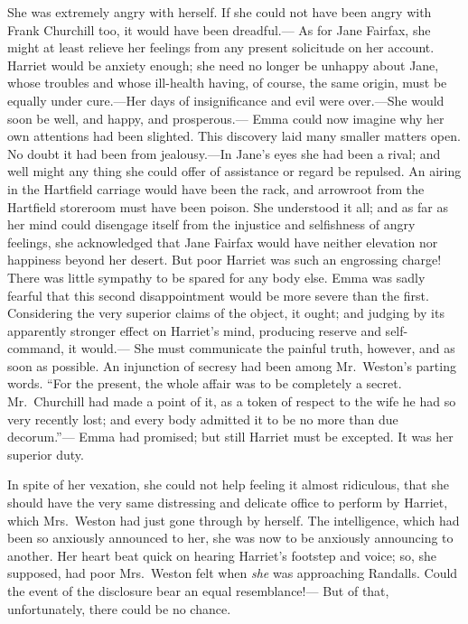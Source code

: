 She was extremely angry with herself.  If she could not have been
angry with Frank Churchill too, it would have been dreadful.---%
As for Jane Fairfax, she might at least relieve her feelings
from any present solicitude on her account.  Harriet would
be anxiety enough; she need no longer be unhappy about Jane,
whose troubles and whose ill-health having, of course, the same origin,
must be equally under cure.---Her days of insignificance and evil
were over.---She would soon be well, and happy, and prosperous.---%
Emma could now imagine why her own attentions had been slighted.
This discovery laid many smaller matters open.  No doubt it had been
from jealousy.---In Jane's eyes she had been a rival; and well might
any thing she could offer of assistance or regard be repulsed.
An airing in the Hartfield carriage would have been the rack,
and arrowroot from the Hartfield storeroom must have been poison.
She understood it all; and as far as her mind could disengage itself
from the injustice and selfishness of angry feelings, she acknowledged
that Jane Fairfax would have neither elevation nor happiness beyond
her desert.  But poor Harriet was such an engrossing charge!
There was little sympathy to be spared for any body else.
Emma was sadly fearful that this second disappointment would be
more severe than the first.  Considering the very superior claims
of the object, it ought; and judging by its apparently stronger effect
on Harriet's mind, producing reserve and self-command, it would.---%
She must communicate the painful truth, however, and as soon
as possible.  An injunction of secresy had been among Mr.\ Weston's
parting words.  ``For the present, the whole affair was to be
completely a secret.  Mr.\ Churchill had made a point of it,
as a token of respect to the wife he had so very recently lost;
and every body admitted it to be no more than due decorum.''---%
Emma had promised; but still Harriet must be excepted.  It was her
superior duty.

In spite of her vexation, she could not help feeling it almost ridiculous,
that she should have the very same distressing and delicate office to
perform by Harriet, which Mrs.\ Weston had just gone through by herself.
The intelligence, which had been so anxiously announced to her,
she was now to be anxiously announcing to another.  Her heart beat
quick on hearing Harriet's footstep and voice; so, she supposed,
had poor Mrs.\ Weston felt when \emph{she} was approaching Randalls.
Could the event of the disclosure bear an equal resemblance!---%
But of that, unfortunately, there could be no chance.

